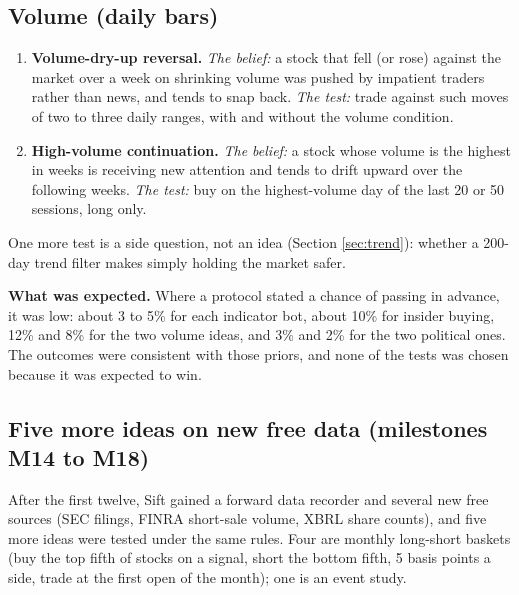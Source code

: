 \documentclass[11pt,a4paper]{article}
\providecommand{\tightlist}{\setlength{\itemsep}{0pt}\setlength{\parskip}{0pt}}
\begin{document}
\subsection{Volume (daily bars)}\label{volume-daily-bars}

\begin{enumerate}
\def\labelenumi{\arabic{enumi}.}
\setcounter{enumi}{10}
\tightlist
\item
  \textbf{Volume-dry-up reversal.} \emph{The belief:} a stock that fell (or rose) against the market over a week on shrinking volume was
  pushed by impatient traders rather than news, and tends to snap back. \emph{The test:} trade against such moves of two to
  three daily ranges, with and without the volume condition.
\item
  \textbf{High-volume continuation.} \emph{The belief:} a stock whose volume is the highest in weeks is receiving new attention and tends
  to drift upward over the following weeks. \emph{The test:} buy on the highest-volume day of the last 20 or 50 sessions, long only.
\end{enumerate}

One more test is a side question, not an idea (Section \ref{sec:trend}): whether a 200-day trend filter makes simply holding the market
safer.

\textbf{What was expected.} Where a protocol stated a chance of passing in advance, it was low: about 3 to 5\% for each indicator
bot, about 10\% for insider buying, 12\% and 8\% for the two volume ideas, and 3\% and 2\% for the two political ones. The
outcomes were consistent with those priors, and none of the tests was chosen because it was expected to win.

\subsection{Five more ideas on new free data (milestones M14 to M18)}\label{sec:newideas}

After the first twelve, Sift gained a forward data recorder and several new free sources (SEC filings, FINRA short-sale
volume, XBRL share counts), and five more ideas were tested under the same rules. Four are monthly long-short baskets
(buy the top fifth of stocks on a signal, short the bottom fifth, 5 basis points a side, trade at the first open of the month);
one is an event study.
\end{document}
